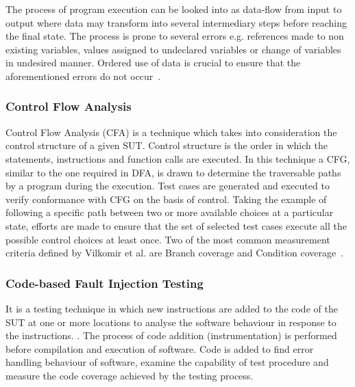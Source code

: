 The process of program execution can be looked into as data-flow from input to output where data may transform into several intermediary steps before reaching the final state. The process is prone to several errors e.g. references made to non existing variables, values assigned to undeclared variables or change of variables in undesired manner. Ordered use of data is crucial to ensure that the aforementioned errors do not occur~\cite{fosdick1976data}.

\subsubsection{Control Flow Analysis}
Control Flow Analysis (CFA) is a technique which takes into consideration the control structure of a given SUT. Control structure is the order in which the statements, instructions and function calls are executed. In this technique a CFG, similar to the one required in DFA, is drawn to determine the traversable paths by a program during the execution. Test cases are generated and executed to verify conformance with CFG on the basis of control. Taking the example of following a specific path between two or more available choices at a particular state, efforts are made to ensure that the set of selected test cases execute all the possible control choices at least once. Two of the most common measurement criteria defined by Vilkomir et al. are Branch coverage and Condition coverage~\cite{vilkomir2003tolerance}. 

\subsubsection{Code-based Fault Injection Testing}
It is a testing technique in which new instructions are added to the code of the SUT at one or more locations to analyse the software behaviour in response to the instructions. \cite{voas1997software}. The process of code addition (instrumentation) is performed before compilation and execution of software. Code is added to find error handling behaviour of software, examine the capability of test procedure and measure the code coverage achieved by the testing process.    

